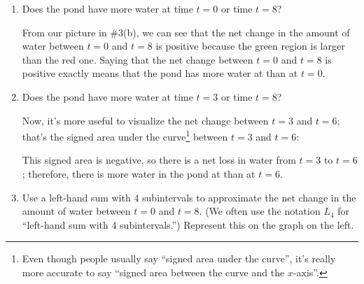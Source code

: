 \documentclass[main]{subfiles}
\begin{document}
\begin{enumerate}
{\begin{enumerate}
    \item
      \begin{problem}[\vfill]
        Does the pond have more water at time $t = 0$ or time $t = 8$?
      \end{problem}

      \begin{solution}
        From our picture in {{{{\#3}}(b)}}, we
        can see that the net change in the amount of water between $t = 0$
        and $t = 8$ is positive because the green region is larger than
        the red one.  Saying that the net change between $t = 0$ and $t =
        8$ is positive exactly means that the pond has more water at
         than at $t = 0$.
      \end{solution}

    \item
      \begin{problem}[\vfill\newpage]
        Does the pond have more water at time $t = 3$ or time $t = 8$?
      \end{problem}

      \begin{solution}
        Now, it's more useful to visualize the net change between $t = 3$
        and $t = 6$; that's the signed area under the curve\footnote{Even
          though people usually say ``signed area under the curve'', it's
          really more accurate to say ``signed area between the curve and
          the $x$-axis''.} between $t = 3$ and $t = 6$:
        \begin{center}
        \end{center}
        This signed area is negative, so there is a net loss in water from
        $t = 3$ to $t = 6$; therefore, there is more water in the pond at
         than at $t = 6$. 
      \end{solution}

    \item
      \begin{problem}[\vfill]
        Use a left-hand sum with 4 subintervals to approximate the net
        change in the amount of water between $t = 0$ and $t = 8$.  (We
        often use the notation $L_4$ for ``left-hand sum with 4
        subintervals.'') Represent this on the graph on the left.


\end{problem}
\end{enumerate}}
\end{enumerate}
\end{document}
